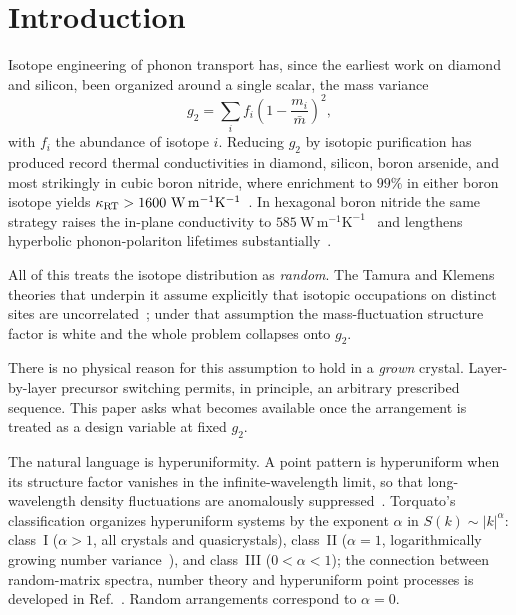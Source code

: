 \documentclass[
  aps,
  prl,
  reprint,
  amsmath,
  amssymb,
  superscriptaddress,
  floatfix,
  nofootinbib
]{revtex4-2}
\begin{document}
\maketitle

\section{Introduction}
\label{sec:intro}

Isotope engineering of phonon transport has, since the earliest work on
diamond and silicon, been organized around a single scalar, the mass variance
\begin{equation}
  g_2 = \sum_i f_i\left(1-\frac{m_i}{\bar m}\right)^{\!2},
  \label{eq:g2}
\end{equation}
with $f_i$ the abundance of isotope $i$. Reducing $g_2$ by isotopic
purification has produced record thermal conductivities in diamond, silicon,
boron arsenide, and most strikingly in cubic boron nitride, where enrichment
to $99\%$ in either boron isotope yields
$\kappa_{\rm RT}>1600~\mathrm{W\,m^{-1}K^{-1}}$~\cite{Chen2020}. In hexagonal
boron nitride the same strategy raises the in-plane conductivity to
$585~\mathrm{W\,m^{-1}K^{-1}}$~\cite{Yuan2019} and lengthens hyperbolic
phonon-polariton lifetimes substantially~\cite{Giles2018}.

All of this treats the isotope distribution as \emph{random}. The Tamura and
Klemens theories that underpin it assume explicitly that isotopic occupations
on distinct sites are uncorrelated~\cite{Tamura1983,Klemens1955}; under that
assumption the mass-fluctuation structure factor is white and the whole
problem collapses onto $g_2$.

There is no physical reason for this assumption to hold in a \emph{grown}
crystal. Layer-by-layer precursor switching permits, in principle, an
arbitrary prescribed sequence. This paper asks what becomes available once the
arrangement is treated as a design variable at fixed $g_2$.

The natural language is hyperuniformity. A point pattern is hyperuniform when
its structure factor vanishes in the infinite-wavelength limit, so that
long-wavelength density fluctuations are anomalously
suppressed~\cite{Torquato2018,Torquato2003}. Torquato's classification
organizes hyperuniform systems by the exponent $\alpha$ in $S(k)\sim|k|^\alpha$:
class~I ($\alpha>1$, all crystals and quasicrystals), class~II ($\alpha=1$,
logarithmically growing number variance~\cite{Zachary2009}), and class~III
($0<\alpha<1$); the connection between random-matrix spectra, number theory
and hyperuniform point processes is developed in
Ref.~\cite{Torquato2008}. Random
arrangements correspond to $\alpha=0$.
\end{document}
